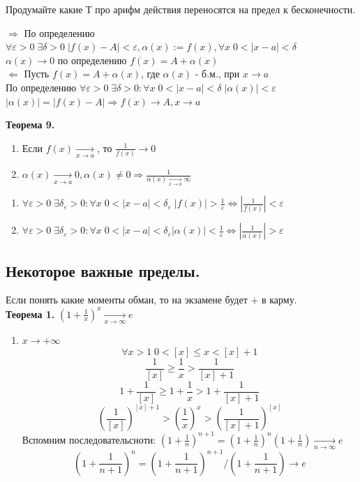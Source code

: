 \documentclass[12pt, a4paper]{article}
\newcommand{\eps}{\varepsilon}
\begin{document}
Продумайте какие Т про арифм действия переносятся на предел к бесконечности.
\begin{tcolorbox}[title=Доказательство]
$\Rightarrow$ По определению $\forall \eps > 0\; \exists \delta > 0\; |f(x) - A| < \eps, \alpha(x) := f(x), \forall x\; 0 < |x - a| < \delta$\\
$\alpha(x) \to 0$ по определению $f(x) = A + \alpha(x)$\\
$\Leftarrow$ Пусть $f(x) = A + \alpha(x)$, где $\alpha(x)$ - б.м., при $x \to a$\\
По определению $\forall \eps > 0\; \exists \delta > 0: \forall x\; 0< |x - a| < \delta\; |\alpha(x)| < \eps$\\
$|\alpha(x)| = |f(x) - A| \Rightarrow f(x) \to A, x \to a$
\end{tcolorbox}

\textbf{Теорема 9.}
\begin{enumerate}
	\item Если $f(x) \xrightarrow[x\to a]{}$, то $\frac{1}{f(x)} \to 0$
	\item $\alpha(x) \xrightarrow[x\to a]{} 0, \alpha(x) \not= 0 \Rightarrow \frac{1}{\alpha(x) \xrightarrow[x \to a]{} \infty}$
\end{enumerate}
\begin{tcolorbox}[title=Доказательство]
	\begin{enumerate}
		\item $\forall \eps > 0\; \exists \delta_\eps > 0: \forall x\; 0 < |x - a| < \delta_\eps\; |f(x)| > \frac{1}{\eps} \Leftrightarrow |\frac{1}{f(x)}| < \eps$
		\item $\forall \eps > 0\; \exists \delta_\eps > 0: \forall x\; 0 < |x - a| < \delta_\eps |\alpha(x)| < \frac{1}{\eps} \Leftrightarrow |\frac{1}{\alpha(x)}| > \eps$
	\end{enumerate}
\end{tcolorbox}

\subsection{Некоторое важные пределы.}
Если понять какие моменты обман, то на экзамене будет + в карму. \\
\textbf{Теорема 1.} $(1 + \frac{1}{x})^x \xrightarrow[x\to \infty]{} e$
\begin{tcolorbox}[title=Доказательство]
	\begin{enumerate}
		\item $x \to +\infty$
			\[ \forall x > 1 \; 0 < [x] \leq x <  [x] + 1 \]
		\[  \frac{1}{[x]} \geq \frac{1}{x} > \frac{1}{[x] + 1} \]
		\[ 1 + \frac{1}{[x]} \geq 1 + \frac{1}{x} > 1 + \frac{1}{[x] + 1} \]
		\[ (\frac{1}{[x]})^{[x]+1} > (\frac{1}{x})^x > (\frac{1}{[x] + 1})^{[x]} \]
		Вспомним последовательсноти: $(1 + \frac{1}{n})^{n+1} = (1 + \frac{1}{n})^n (1 + \frac{1}{n}) \xrightarrow[n\to\infty]{} e $
		\[ (1 + \frac{1}{n+1})^n = (1 + \frac{1}{n+1})^{n+1} / (1 + \frac{1}{n+1}) \to e \]
	\end{enumerate}
\end{tcolorbox}
\end{document}
